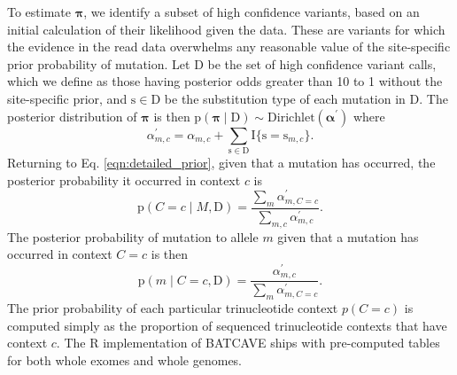 \documentclass[a4,center,fleqn]{NAR}
\newcommand{\batcave}{BATCAVE }
\begin{document}
To estimate $\boldsymbol{\pi}$, we identify a subset of high confidence variants, based on an initial calculation of their likelihood given the data.
These are variants for which the evidence in the read data overwhelms any reasonable value of the site-specific prior probability of mutation.
Let $\mathrm{D}$ be the set of high confidence variant calls, which we define as those having posterior odds greater than 10 to 1 without the site-specific prior, and $\mathrm{s} \in \mathrm{D}$ be the substitution type of each mutation in $\mathrm{D}$.
The posterior distribution of $\boldsymbol{\pi}$ is then $\mathrm{p}(\boldsymbol{\pi} \mid \mathrm{D}) \sim \textrm{Dirichlet}(\boldsymbol{\alpha^{\prime}})$ where
\begin{equation}
    \alpha^{\prime}_{m,c} = \alpha_{m,c} + \sum\limits_{\mathrm{s} \in \mathrm{D}} \mathrm{I}\{\mathrm{s} = \mathrm{s}_{m,c}\}.
\end{equation}
Returning to Eq. \ref{eqn:detailed_prior}, given that a mutation has occurred, the posterior probability it occurred in context $c$ is
\begin{equation}
  \label{eqn:post_pred}
  \mathrm{p}(C = c \mid M,\mathrm{D}) = \frac{\sum_{m}\alpha^{\prime}_{m,C = c}}{\sum_{m,c}\alpha^{\prime}_{m,c}}.
\end{equation}
The posterior probability of mutation to allele $m$ given that a mutation has occurred in context $C = c$ is then
\begin{equation}
  \label{eqn:to_allele}
   \mathrm{p}(m \mid C = c,\mathrm{D}) = \frac{\alpha^{\prime}_{m,c}}{\sum_{m} \alpha^{\prime}_{m,C = c}}.
\end{equation}
The prior probability of each particular trinucleotide context $p(C = c)$ is computed simply as the proportion of sequenced trinucleotide contexts that have context $c$.
The R implementation of \batcave ships with pre-computed tables for both whole exomes and whole genomes.
\end{document}
